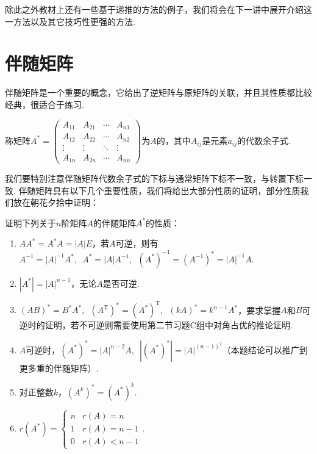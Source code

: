 除此之外教材上还有一些基于递推的方法的例子，我们将会在下一讲中展开介绍这一方法以及其它技巧性更强的方法.

\section{伴随矩阵}

伴随矩阵是一个重要的概念，它给出了逆矩阵与原矩阵的关联，并且其性质都比较经典，很适合于练习.
\begin{definition}[伴随矩阵] 
    称矩阵$A^*=\begin{pmatrix}
            A_{11} & A_{21} & \cdots & A_{n1} \\
            A_{12} & A_{22} & \cdots & A_{n2} \\
            \vdots & \vdots & \ddots & \vdots \\
            A_{1n} & A_{2n} & \cdots & A_{nn}
        \end{pmatrix}$为$A$的，其中$A_{ij}$是元素$a_{ij}$的代数余子式.
\end{definition}
我们要特别注意伴随矩阵代数余子式的下标与通常矩阵下标不一致，与转置下标一致. 伴随矩阵具有以下几个重要性质，我们将给出大部分性质的证明，部分性质我们放在朝花夕拾中证明：
\begin{example} \label{ex:13:伴随矩阵}
    证明下列关于$n$阶矩阵$A$的伴随矩阵$A^*$的性质：
    \begin{enumerate}
        \item \label{item:13:伴随矩阵:1}
              $AA^*=A^*A=|A|E$，若$A$可逆，则有$A^{-1}=|A|^{-1}A^*,\enspace A^*=|A|A^{-1},\enspace (A^*)^{-1}=(A^{-1})^*=|A|^{-1}A$.

        \item $|A^*|=|A|^{n-1}$，无论$A$是否可逆.

        \item \label{item:13:伴随矩阵:3}
              $(AB)^*=B^*A^*,\enspace (A^\mathrm{T})^*=(A^*)^\mathrm{T},\enspace (kA)^*=k^{n-1}A^*$，要求掌握$A$和$B$可逆时的证明，若不可逆则需要使用第二节习题C组中对角占优的推论证明.

        \item $A$可逆时，$(A^*)^*=|A|^{n-2}A,\enspace |(A^*)^*|=|A|^{(n-1)^2}$（本题结论可以推广到更多重的伴随矩阵）.

        \item 对正整数$k$，$(A^k)^*=(A^*)^k$.

        \item $r(A^*)=\begin{cases}
                      n & r(A)=n     \\
                      1 & r(A)=n-1   \\
                      0 & r(A) < n-1
                  \end{cases}$.
    \end{enumerate}
\end{example}

